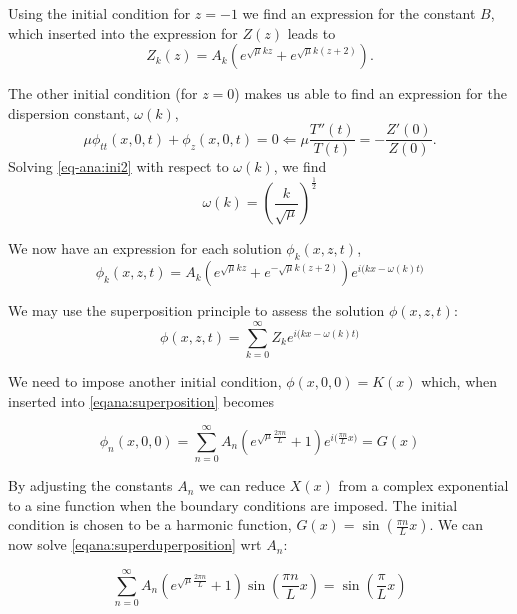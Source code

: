 \documentclass[11pt]{article}
\begin{document}
Using the initial condition for $z = -1$ we find an expression for the constant $B$, which inserted into the expression for $Z(z)$ leads to
\begin{equation}
Z_k(z) = A_k \left( e^{\sqrt{\mu}kz} + e^{ \sqrt{\mu}k(z+2) } \right).
\end{equation}

The other initial condition (for $z=0$) makes us able to find an expression for the dispersion constant, $\omega(k)$,
\begin{equation}
\mu \phi_{tt}(x,0,t) + \phi_{z}(x,0,t) = 0 \Longleftarrow \mu \frac{T''(t)}{T(t)} = - \frac{Z'(0)}{Z(0)}.
\label{eq-ana:ini2}
\end{equation}
Solving \eqref{eq-ana:ini2} with respect to $\omega(k)$, we find
\begin{equation}
\omega(k) = \left( \frac{k}{\sqrt{\mu}} \right)^{\frac{1}{2}}
\end{equation}

We now have an expression for each solution $\phi_k(x,z,t)$,
\begin{equation}
\phi_k(x,z,t) = A_k \left( e^{\sqrt{\mu}kz} + e^{-\sqrt{\mu}k(z+2)} \right) e^{i\big( kx - \omega(k)t \big)}
\end{equation}

We may use the superposition principle to assess the solution $\phi(x,z,t)$:
\begin{equation}
\label{eqana:superposition}
\phi(x,z,t) = \sum_{k=0}^{\infty} Z_k e^{i\big(kx - \omega(k) t \big)}
\end{equation}

We need to impose another initial condition, $\phi(x,0,0) = K(x)$ which, when inserted into \ref{eqana:superposition} becomes

\begin{equation}
\phi_n(x,0,0) = \sum_{n=0}^{\infty} A_n \left( e^{\sqrt{\mu}\frac{2 \pi n}{L}} + 1 \right) e^{ i \big( \frac{\pi n}{L}x \big) } = G(x)
\label{eqana:superduperposition}
\end{equation}

By adjusting the constants $A_n$ we can reduce $X(x)$ from a complex exponential to a sine function when the boundary conditions are imposed. The initial condition is chosen to be a harmonic function, $G(x) = \sin \left(\frac{\pi n}{L}x \right)$. We can now solve \ref{eqana:superduperposition} wrt $A_n$:

\begin{equation}
\sum_{n=0}^{\infty} A_n \left( e^{\sqrt{\mu}\frac{2 \pi n}{L}} + 1 \right) \sin \left(\frac{\pi n}{L}x \right) = \sin \left( \frac{\pi }{L}x \right)
\end{equation}
\end{document}
